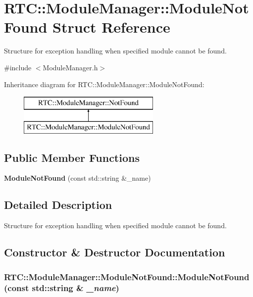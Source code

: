 \section{RTC::ModuleManager::ModuleNotFound Struct Reference}
\label{structRTC_1_1ModuleManager_1_1ModuleNotFound}


Structure for exception handling when specified module cannot be found.  




{\ttfamily \#include $<$ModuleManager.h$>$}

Inheritance diagram for RTC::ModuleManager::ModuleNotFound:\begin{figure}[H]
\begin{center}
\leavevmode
\includegraphics[height=2cm]{structRTC_1_1ModuleManager_1_1ModuleNotFound}
\end{center}
\end{figure}
\subsection*{Public Member Functions}
\begin{DoxyCompactItemize}
\item 
{\bf ModuleNotFound} (const std::string \&\_\-name)
\end{DoxyCompactItemize}


\subsection{Detailed Description}
Structure for exception handling when specified module cannot be found. 

\subsection{Constructor \& Destructor Documentation}
\subsubsection[{ModuleNotFound}]{\setlength{\rightskip}{0pt plus 5cm}RTC::ModuleManager::ModuleNotFound::ModuleNotFound (const std::string \& {\em \_\-name})\hspace{0.3cm}{\ttfamily  [inline]}}\label{structRTC_1_1ModuleManager_1_1ModuleNotFound_a24f3fd51dff9c8835d5884d1c8e205e5}
